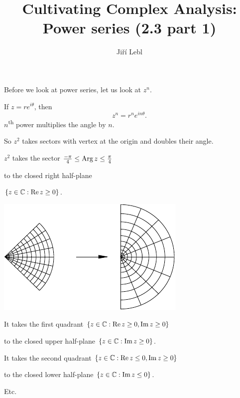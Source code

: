 \documentclass[10pt,aspectratio=169]{beamer}
\author{Ji\v{r}\'i Lebl}
\institute[OSU]{%
Departemento pri Matematiko de Oklahoma {\^S}tata Universitato}
\title{Cultivating Complex Analysis:\\%
Power series (2.3 part 1)}
\date{}
\begin{document}
\begin{frame}
\titlepage
\end{frame}

\begin{frame}
Before we look at power series, let us look at $z^n$.

\medskip
\pause

If $z = re^{i\theta}$, then
\[
z^n = r^n e^{i n\theta} .
\]
$n$\textsuperscript{th} power multiplies the angle by $n$.

\medskip
\pause
So $z^2$ takes sectors with vertex at the origin and doubles their angle.

\medskip
\pause

$z^2$ takes the sector
$\frac{-\pi}{4} \leq \operatorname{Arg} z \leq \frac{\pi}{4}$

to the closed right half-plane

$\{ z \in {\mathbb{C}} : \operatorname{Re} z \geq 0 \}$.

\vspace*{-0.7in}
\hspace{3in}%
\includegraphics{../figures/zsqplot}

\pause
\vspace*{-0.3in}
It takes the first quadrant
$\{ z \in {\mathbb{C}} : \operatorname{Re} z \geq 0, \operatorname{Im} z \geq 0 \}$

to the closed upper half-plane $\{ z \in {\mathbb{C}} : \operatorname{Im} z \geq 0 \}$.

\medskip
\pause

It takes the second quadrant
$\{ z \in {\mathbb{C}} : \operatorname{Re} z \leq 0, \operatorname{Im} z \geq 0 \}$

to the closed lower half-plane $\{ z \in {\mathbb{C}} : \operatorname{Im} z \leq 0 \}$.

\medskip
\pause

Etc.
\end{frame}
\end{document}
